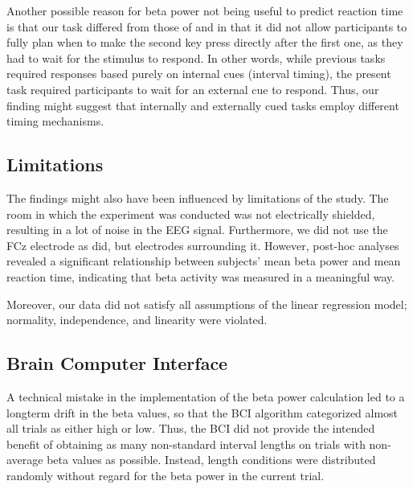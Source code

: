 \documentclass[man,floatsintext]{apa6} %
\begin{document}
Another possible reason for beta power not being useful to predict
reaction time is that our task differed from those of
 and  in
that it did not allow participants to fully plan when to make the
second key press directly after the first one, as they had to wait for
the stimulus to respond. In other words, while previous tasks required
responses based purely on internal cues (interval timing), the present
task required participants to wait for an external cue to
respond. Thus, our finding might suggest that internally and
externally cued tasks employ different timing mechanisms.

\subsection{Limitations}
The findings might also have been influenced by limitations of the
study. The room in which the experiment was conducted was not
electrically shielded, resulting in a lot of noise in the EEG    %
signal. Furthermore, we did not use the FCz electrode as
 did, but electrodes surrounding       %
it. However, post-hoc analyses revealed a significant relationship
between subjects' mean beta power and mean reaction time, indicating
that beta activity was measured in a meaningful way.

Moreover, our data did not satisfy all assumptions of the linear
regression model; normality, independence, and linearity were
violated.

\subsection{Brain Computer Interface}
A technical mistake in the implementation of the beta power
calculation led to a longterm drift in the beta values, so that the
BCI algorithm categorized almost all trials as either high or
low. Thus, the BCI did not provide the intended benefit of obtaining
as many non-standard interval lengths on trials with non-average beta
values as possible. Instead, length conditions were distributed
randomly without regard for the beta power in the current trial.
\end{document}
